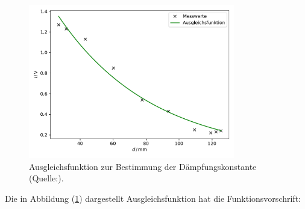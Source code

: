 \begin{figure}
    \centering
    \includegraphics[width=9cm]{daempf.pdf}
    \caption{Ausgleichsfunktion zur Bestimmung der Dämpfungskonstante (Quelle:\cite{US1}).}
    \label{fig:daempf}
  \end{figure}

\noindent
Die in Abbildung (\ref{fig:daempf}) dargestellt Ausgleichsfunktion hat die Funktionsvorschrift:

